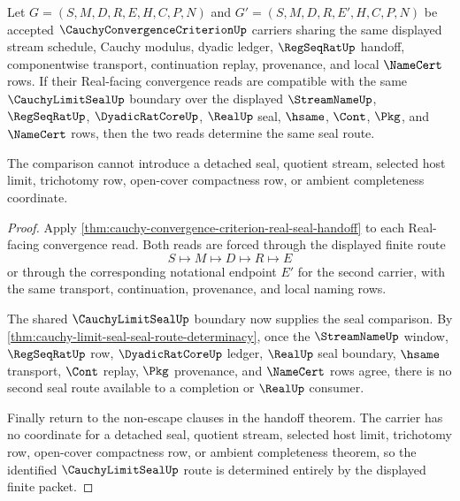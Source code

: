 \begin{theorem}
\label{thm:cauchy-convergence-criterion-limit-seal-determinacy}
Let $G=(S,M,D,R,E,H,C,P,N)$ and $G'=(S,M,D,R,E',H,C,P,N)$ be accepted $\CauchyConvergenceCriterionUp$ carriers sharing the same displayed stream schedule, Cauchy modulus, dyadic ledger, $\RegSeqRatUp$ handoff, componentwise transport, continuation replay, provenance, and local $\NameCert$ rows. If their Real-facing convergence reads are compatible with the same $\CauchyLimitSealUp$ boundary over the displayed $\StreamNameUp$, $\RegSeqRatUp$, $\DyadicRatCoreUp$, $\RealUp$ seal, $\hsame$, $\Cont$, $\Pkg$, and $\NameCert$ rows, then the two reads determine the same seal route.

The comparison cannot introduce a detached seal, quotient stream, selected host limit, trichotomy row, open-cover compactness row, or ambient completeness coordinate.
\end{theorem}
\begin{proof}
Apply \autoref{thm:cauchy-convergence-criterion-real-seal-handoff} to each Real-facing convergence read. Both reads are forced through the displayed finite route
$$
S \longmapsto M \longmapsto D \longmapsto R \longmapsto E
$$
or through the corresponding notational endpoint $E'$ for the second carrier, with the same transport, continuation, provenance, and local naming rows.

The shared $\CauchyLimitSealUp$ boundary now supplies the seal comparison. By \autoref{thm:cauchy-limit-seal-seal-route-determinacy}, once the $\StreamNameUp$ window, $\RegSeqRatUp$ row, $\DyadicRatCoreUp$ ledger, $\RealUp$ seal boundary, $\hsame$ transport, $\Cont$ replay, $\Pkg$ provenance, and $\NameCert$ rows agree, there is no second seal route available to a completion or $\RealUp$ consumer.

Finally return to the non-escape clauses in the handoff theorem. The carrier has no coordinate for a detached seal, quotient stream, selected host limit, trichotomy row, open-cover compactness row, or ambient completeness theorem, so the identified $\CauchyLimitSealUp$ route is determined entirely by the displayed finite packet.
\end{proof}

